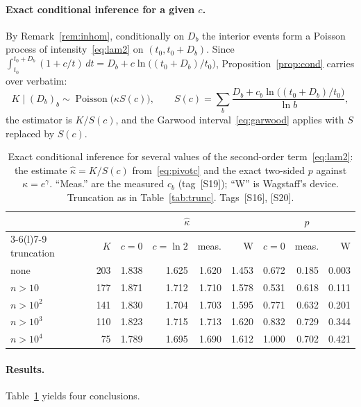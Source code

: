 \documentclass[11pt,a4paper]{article}
\theoremstyle{plain}
\theoremstyle{remark}
\newcommand{\eg}{e^{\gamma}}
\DeclareMathOperator{\Pois}{Poisson}
\begin{document}
\paragraph{Exact conditional inference for a given $c$.} By
Remark~\ref{rem:inhom}, conditionally on $D_b$ the interior events form a
Poisson process of intensity~\eqref{eq:lam2} on $(t_0,t_0+D_b)$. Since
$\int_{t_0}^{t_0+D_b}(1+c/t)\,dt=D_b+c\ln\bigl((t_0+D_b)/t_0\bigr)$,
Proposition~\ref{prop:cond} carries over verbatim:
\begin{equation}\label{eq:pivotc}
K\mid(D_b)_b\sim\Pois\bigl(\kappa S(c)\bigr),\qquad
S(c)=\sum_b\frac{D_b+c_b\ln\bigl((t_0+D_b)/t_0\bigr)}{\ln b},
\end{equation}
the estimator is $K/S(c)$, and the Garwood interval~\eqref{eq:garwood} applies
with $S$ replaced by $S(c)$.

\begin{table}[t]
\centering
\caption{Exact conditional inference for several values of the second-order
term~\eqref{eq:lam2}: the estimate $\hat\kappa=K/S(c)$ from~\eqref{eq:pivotc} and the
exact two-sided $p$ against $\kappa=\eg$. ``Meas.'' are the measured $c_b$
(tag~[S19]); ``W'' is Wagstaff's device. Truncation as in Table~\ref{tab:trunc}.
Tags~[S16], [S20].}
\label{tab:second}
\small
\setlength{\tabcolsep}{4pt}
\begin{tabular}{lrrrrrrrr}
\toprule
& & \multicolumn{4}{c}{$\hat\kappa$} & \multicolumn{3}{c}{$p$}\\
\cmidrule(lr){3-6}\cmidrule(l){7-9}
truncation & $K$ & $c{=}0$ & $c{=}\ln2$ & meas. & W & $c{=}0$ & meas. & W\\
\midrule
none & 203 & 1.838 & 1.625 & 1.620 & 1.453 & 0.672 & 0.185 & 0.003\\
$n>10$ & 177 & 1.871 & 1.712 & 1.710 & 1.578 & 0.531 & 0.618 & 0.111\\
$n>10^2$ & 141 & 1.830 & 1.704 & 1.703 & 1.595 & 0.771 & 0.632 & 0.201\\
$n>10^3$ & 110 & 1.823 & 1.715 & 1.713 & 1.620 & 0.832 & 0.729 & 0.344\\
$n>10^4$ & 75 & 1.789 & 1.695 & 1.690 & 1.612 & 1.000 & 0.702 & 0.421\\
\bottomrule
\end{tabular}
\end{table}

\paragraph{Results.} Table~\ref{tab:second} yields four conclusions.
\end{document}
